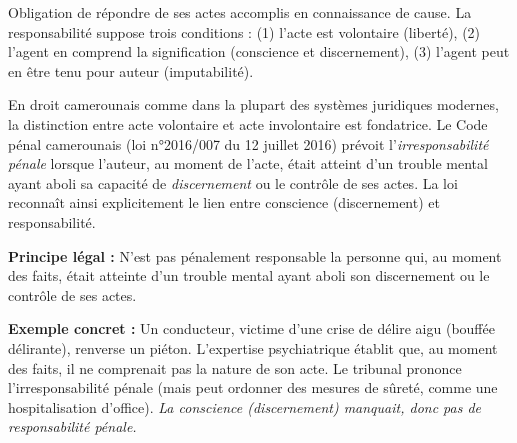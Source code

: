 \documentclass[11pt]{article}
\begin{document}
\begin{definition}[Responsabilité]
Obligation de répondre de ses actes accomplis en connaissance de cause. La responsabilité suppose trois conditions : (1) l'acte est volontaire (liberté), (2) l'agent en comprend la signification (conscience et discernement), (3) l'agent peut en être tenu pour auteur (imputabilité).
\end{definition}

\noindent En droit camerounais comme dans la plupart des systèmes juridiques modernes, la distinction entre acte volontaire et acte involontaire est fondatrice. Le Code pénal camerounais (loi n°2016/007 du 12 juillet 2016) prévoit l'\emph{irresponsabilité pénale} lorsque l'auteur, au moment de l'acte, était atteint d'un trouble mental ayant aboli sa capacité de \emph{discernement} ou le contrôle de ses actes. La loi reconnaît ainsi explicitement le lien entre conscience (discernement) et responsabilité.

\begin{exemplebox}
\textbf{Principe légal :} N'est pas pénalement responsable la personne qui, au moment des faits, était atteinte d'un trouble mental ayant aboli son discernement ou le contrôle de ses actes.

\textbf{Exemple concret :} Un conducteur, victime d'une crise de délire aigu (bouffée délirante), renverse un piéton. L'expertise psychiatrique établit que, au moment des faits, il ne comprenait pas la nature de son acte. Le tribunal prononce l'irresponsabilité pénale (mais peut ordonner des mesures de sûreté, comme une hospitalisation d'office). \emph{La conscience (discernement) manquait, donc pas de responsabilité pénale.}
\end{exemplebox}
\end{document}

